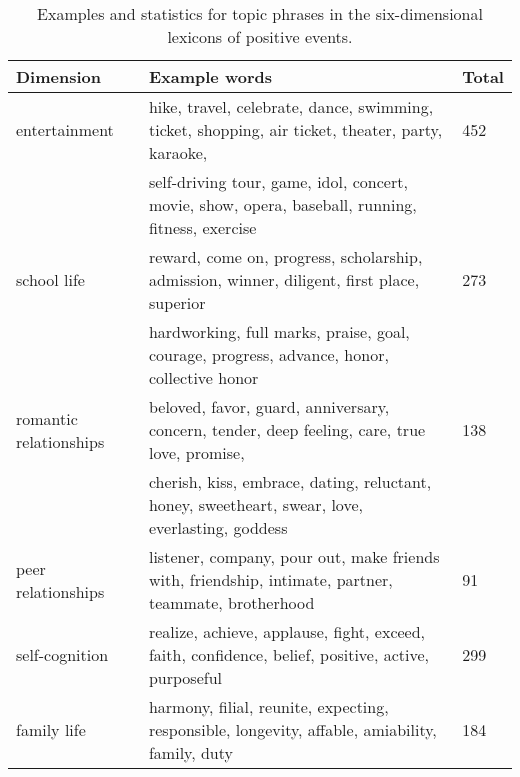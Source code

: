 \documentclass[5p,times,numbers,authoryear]{elsarticle}
\begin{document}
\begin{table*}
\centering
\caption{\small{Examples and statistics for topic phrases in the six-dimensional lexicons of positive events.}}
\label{tab:topicWords}
\small{
\begin{tabular}{lll}
\toprule
Dimension & Example words & Total \\ \midrule
entertainment  & hike, travel, celebrate, dance, swimming, ticket, shopping, air ticket, theater, party, karaoke,& 452\\
                      & self-driving tour, game, idol, concert, movie, show, opera, baseball, running, fitness, exercise & \\
school life    & reward, come on, progress, scholarship, admission, winner, diligent, first place, superior & 273\\
				      & hardworking, full marks,  praise, goal, courage, progress, advance, honor, collective honor& \\
romantic relationships      &  beloved, favor, guard, anniversary,  concern, tender, deep feeling, care, true love, promise, & 138\\
				      & cherish, kiss, embrace, dating, reluctant, honey, sweetheart, swear, love, everlasting, goddess &\\
peer relationships  & listener, company, pour out, make friends with, friendship, intimate, partner, teammate, brotherhood& 91\\
self-cognition & realize, achieve, applause, fight, exceed, faith, confidence, belief, positive, active, purposeful & 299\\
family life    & harmony, filial, reunite, expecting, responsible, longevity, affable, amiability, family, duty & 184\\
\bottomrule
\end{tabular}}
\end{table*}
\end{document}
